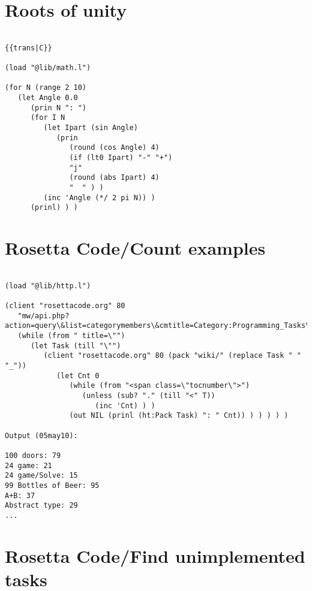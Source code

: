 \section*{Roots of unity}

\begin{verbatim}

{{trans|C}}

(load "@lib/math.l")

(for N (range 2 10)
   (let Angle 0.0
      (prin N ": ")
      (for I N
         (let Ipart (sin Angle)
            (prin
               (round (cos Angle) 4)
               (if (lt0 Ipart) "-" "+")
               "j"
               (round (abs Ipart) 4)
               "  " ) )
         (inc 'Angle (*/ 2 pi N)) )
      (prinl) ) )

\end{verbatim}

\section*{Rosetta Code/Count examples}

\begin{verbatim}

(load "@lib/http.l")

(client "rosettacode.org" 80
   "mw/api.php?action=query\&list=categorymembers\&cmtitle=Category:Programming_Tasks\&cmlimit=500\&format=xml"
   (while (from " title=\"")
      (let Task (till "\"")
         (client "rosettacode.org" 80 (pack "wiki/" (replace Task " " "_"))
            (let Cnt 0
               (while (from "<span class=\"tocnumber\">")
                  (unless (sub? "." (till "<" T))
                     (inc 'Cnt) ) )
               (out NIL (prinl (ht:Pack Task) ": " Cnt)) ) ) ) ) )

Output (05may10):

100 doors: 79
24 game: 21
24 game/Solve: 15
99 Bottles of Beer: 95
A+B: 37
Abstract type: 29
...

\end{verbatim}

\section*{Rosetta Code/Find unimplemented tasks}

